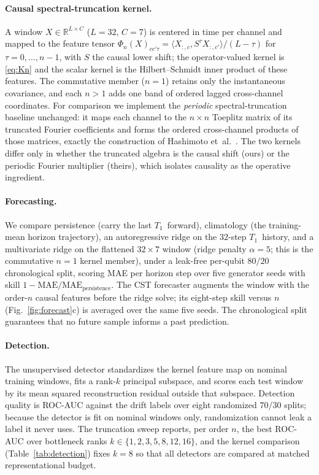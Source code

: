 \documentclass[
  aps,
  prresearch,
  reprint,
  amsmath,
  amssymb,
  nofootinbib,
  floatfix,
]{revtex4-2}
\newcommand{\T}{\ensuremath{T_1}}
\begin{document}
\paragraph{Causal spectral-truncation kernel.}
A window $X\in\mathbb{R}^{L\times C}$ ($L=32$, $C=7$) is centered in time per channel
and mapped to the feature tensor
$\Phi_n(X)_{cc'\tau}=\langle X_{:,c},S^{\tau}X_{:,c'}\rangle/(L-\tau)$ for
$\tau=0,\dots,n-1$, with $S$ the causal lower shift; the operator-valued kernel is
\eqref{eq:Kn} and the scalar kernel is the Hilbert--Schmidt inner product of these
features. The commutative member ($n{=}1$) retains only the instantaneous
covariance, and each $n{>}1$ adds one band of ordered lagged cross-channel
coordinates. For comparison we implement the \emph{periodic} spectral-truncation
baseline unchanged: it maps each channel to the $n\times n$ Toeplitz matrix of its
truncated Fourier coefficients and forms the ordered cross-channel products of those
matrices, exactly the construction of Hashimoto
et~al.~\citep{hashimoto2024spectral}. The two kernels differ only in whether the
truncated algebra is the causal shift (ours) or the periodic Fourier multiplier
(theirs), which isolates causality as the operative ingredient.

\paragraph{Forecasting.}
We compare persistence (carry the last \T\ forward), climatology (the training-mean
horizon trajectory), an autoregressive ridge on the $32$-step \T\ history, and a
multivariate ridge on the flattened $32\times7$ window (ridge penalty $\alpha=5$;
this is the commutative $n{=}1$ kernel member), under a leak-free per-qubit $80/20$
chronological split, scoring MAE per horizon step over five generator seeds with
skill $1-\mathrm{MAE}/\mathrm{MAE}_{\text{persistence}}$. The CST forecaster augments
the window with the order-$n$ causal features before the ridge solve; its eight-step
skill versus $n$ (Fig.~\ref{fig:forecast}c) is averaged over the same five seeds. The
chronological split guarantees that no future sample informs a past prediction.

\paragraph{Detection.}
The unsupervised detector standardizes the kernel feature map on nominal training
windows, fits a rank-$k$ principal subspace, and scores each test window by its mean
squared reconstruction residual outside that subspace. Detection quality is ROC-AUC
against the drift labels over eight randomized $70/30$ splits; because the detector
is fit on nominal windows only, randomization cannot leak a label it never uses. The
truncation sweep reports, per order $n$, the best ROC-AUC over bottleneck ranks
$k\in\{1,2,3,5,8,12,16\}$, and the kernel comparison (Table~\ref{tab:detection})
fixes $k=8$ so that all detectors are compared at matched representational budget.
\end{document}
